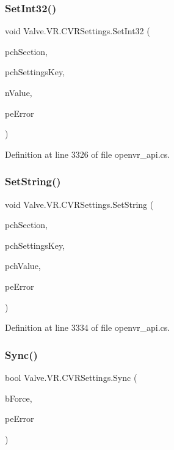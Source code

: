 \subsubsection{\texorpdfstring{SetInt32()}{SetInt32()}}
{\footnotesize\ttfamily void Valve.\+V\+R.\+C\+V\+R\+Settings.\+Set\+Int32 (\begin{DoxyParamCaption}\item[{string}]{pch\+Section,  }\item[{string}]{pch\+Settings\+Key,  }\item[{int}]{n\+Value,  }\item[{ref \mbox{\hyperlink{namespace_valve_1_1_v_r_aeab7722b211afc3885ed77faa931291f}{E\+V\+R\+Settings\+Error}}}]{pe\+Error }\end{DoxyParamCaption})}



Definition at line 3326 of file openvr\+\_\+api.\+cs.

\mbox{\label{class_valve_1_1_v_r_1_1_c_v_r_settings_a797ac0f3fbaca82794b685f4e70a1486}} 
\subsubsection{\texorpdfstring{SetString()}{SetString()}}
{\footnotesize\ttfamily void Valve.\+V\+R.\+C\+V\+R\+Settings.\+Set\+String (\begin{DoxyParamCaption}\item[{string}]{pch\+Section,  }\item[{string}]{pch\+Settings\+Key,  }\item[{string}]{pch\+Value,  }\item[{ref \mbox{\hyperlink{namespace_valve_1_1_v_r_aeab7722b211afc3885ed77faa931291f}{E\+V\+R\+Settings\+Error}}}]{pe\+Error }\end{DoxyParamCaption})}



Definition at line 3334 of file openvr\+\_\+api.\+cs.

\mbox{\label{class_valve_1_1_v_r_1_1_c_v_r_settings_a49ec935dcd62b1292d5a2c05daecdff6}} 
\subsubsection{\texorpdfstring{Sync()}{Sync()}}
{\footnotesize\ttfamily bool Valve.\+V\+R.\+C\+V\+R\+Settings.\+Sync (\begin{DoxyParamCaption}\item[{bool}]{b\+Force,  }\item[{ref \mbox{\hyperlink{namespace_valve_1_1_v_r_aeab7722b211afc3885ed77faa931291f}{E\+V\+R\+Settings\+Error}}}]{pe\+Error }\end{DoxyParamCaption})}



